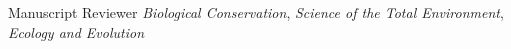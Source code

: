 

\begin{cvskills}
  \cvskill
    {Manuscript Reviewer} %
    {\emph{Biological Conservation}, \emph{Science of the Total Environment}, \emph{Ecology and Evolution}} %

\end{cvskills}
